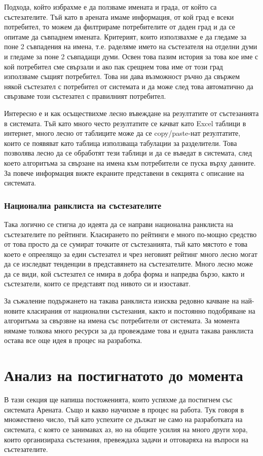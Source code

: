 \documentclass[a4paper,12pt]{article}
\begin{document}
    Подхода, който избрахме е да ползваме имената и града, от който са състезателите. Тъй като в арената имаме информация, от кой град е всеки потребител, то можем да филтрираме потребителите от даден град и да се опитаме да съвпаднем имената. Критерият, които използвахме е да гледаме за поне 2 съвпадения на имена, т.е. раделяме името на състезателя на отделни думи и гледаме за поне 2 съвпадащи думи. Освен това пазим история за това кое име с кой потребител сме свързали и ако пак срещнем това име от този град използваме същият потребител. Това ни дава възможност ръчно да свържем някой състезател с потребител от системата и да може след това автоматично да свързваме този състезател с правилният потребител.
    
    Интересно е и как осъществихме лесно въвеждане на резултатите от състезанията в системата. Тъй като много често резултатите се качват като Excel таблици в интернет, много лесно от таблиците може да се copy/paste-нат резултатите, които се появяват като таблица използваща табулации за разделители. Това позволява лесно да се обработят тези таблици и да се въведат в системата, след което алгоритъма за свързане на имена към потребители се пуска върху данните. За повече информация вижте екраните представени в секцията с описание на системата.

  \subsubsection{Национална ранклиста на състезателите}       
  Така логично се стигна до идеята да се направи национална ранклиста на състезателите по рейтинги. Класирането по рейтинги е много по-мощно средство от това просто да се сумират точките от състезанията, тъй като мястото е това което е опреелящо за един състезател и чрез неговият рейтинг много лесно могат да се изследват тенденции в представянето на състезателите. Много лесно може да се види, кой състезател се нмира в добра форма и напредва бързо, както и състезатели, които се представят под нивото си и изостават.
  
  За съжаление подържането на такава ранклиста изисква редовно качване на най-новите класирания от национални състезания, както и постоянно подобряване на алгоритъма за свързвне на имена със потребители от системата. За момента нямаме толкова много ресурси за да провеждаме това и едната такава ранклиста остава все още идея в процес на разработка.

  \section{Анализ на постигнатото до момента}
  В тази секция ще напиша постоженията, които успяхме да постигнем със системата Арената. Също и какво научихме в процес на работа. Тук говоря в множествено число, тъй като успехите се дължат не само на разработката на системата, с която се занимавах аз, но на общите усилия на много други хора, които организираха състезания, превеждаха задачи и отговаряха на въпроси на състезателите.
  
\end{document}
